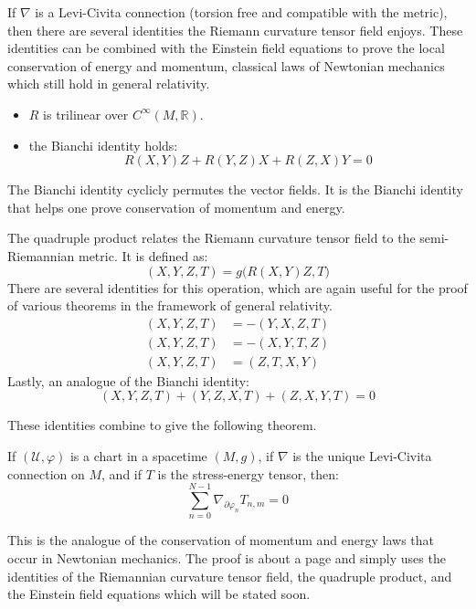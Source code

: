 \documentclass{beamer}
\begin{document}
    \begin{frame}
        If $\nabla$ is a Levi-Civita connection (torsion free and compatible
        with the metric), then there are several identities the Riemann
        curvature tensor field enjoys. These identities can be combined with
        the Einstein field equations to prove the local conservation of
        energy and momentum, classical laws of Newtonian mechanics which still
        hold in general relativity.
        \begin{itemize}
            \item $R$ is trilinear over $C^{\infty}(M,\mathbb{R})$.
            \item the Bianchi identity holds:
                \begin{equation}
                    R(X,Y)Z+R(Y,Z)X+R(Z,X)Y=0
                \end{equation}
        \end{itemize}
        The Bianchi identity cyclicly permutes the vector fields. It is the
        Bianchi identity that helps one prove conservation of momentum and
        energy.
    \end{frame}
    \begin{frame}
        The quadruple product relates the Riemann curvature tensor field to the
        semi-Riemannian metric. It is defined as:
        \begin{equation}
            (X,Y,Z,T)=g\big(R(X,Y)Z,T\big)
        \end{equation}
        There are several identities for this operation, which are again useful
        for the proof of various theorems in the framework of general
        relativity.
        \begin{align}
            (X,Y,Z,T)&=-(Y,X,Z,T)\\
            (X,Y,Z,T)&=-(X,Y,T,Z)\\
            (X,Y,Z,T)&=(Z,T,X,Y)
        \end{align}
        Lastly, an analogue of the Bianchi identity:
        \begin{equation}
            (X,Y,Z,T)+(Y,Z,X,T)+(Z,X,Y,T)=0
        \end{equation}
    \end{frame}
    \begin{frame}
        These identities combine to give the following theorem.
        \begin{theorem}
            If $(\mathcal{U},\varphi)$ is a chart in a spacetime $(M,g)$,
            if $\nabla$ is the unique Levi-Civita connection on $M$, and if
            $T$ is the stress-energy tensor, then:
            \begin{equation}
                \sum_{n=0}^{N-1}\nabla_{\partial\varphi_{n}}T_{n,m}=0
            \end{equation}
        \end{theorem}
        This is the analogue of the conservation of momentum and energy laws
        that occur in Newtonian mechanics. The proof is about a page and simply
        uses the identities of the Riemannian curvature tensor field, the
        quadruple product, and the Einstein field equations which will be
        stated soon.
    \end{frame}
\end{document}
